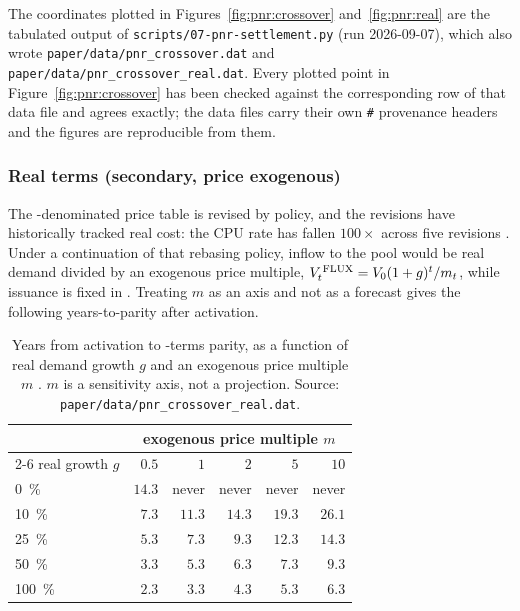 \begin{remark}
The coordinates plotted in Figures~\ref{fig:pnr:crossover} and~\ref{fig:pnr:real} are the tabulated
output of \texttt{scripts/\allowbreak{}07-pnr-settlement.\allowbreak{}py} (run 2026-09-07), which also wrote
\texttt{paper/\allowbreak{}data/\allowbreak{}pnr\_crossover.\allowbreak{}dat} and \texttt{paper/\allowbreak{}data/\allowbreak{}pnr\_crossover\_real.\allowbreak{}dat}. Every
plotted point in Figure~\ref{fig:pnr:crossover} has been checked against the corresponding row of
that data file and agrees exactly; the data files carry their own \texttt{\#} provenance headers and
the figures are reproducible from them.
\end{remark}

\subsubsection{Real terms (secondary, price exogenous)}
\label{sec:pnr:real}

The \flux-denominated price table is revised by policy, and the revisions have historically tracked
real cost: the CPU rate has fallen $100\times$ across five revisions \shipped
{}. Under a continuation of that
rebasing policy, \flux inflow to the pool would be real demand divided by an exogenous price multiple,
$V^{\,\mathrm{FLUX}}_t = V_0(1+g)^{t}/m_t$, while issuance is fixed in \flux. Treating $m$ as an axis and not
as a forecast gives the following years-to-parity after activation.

\begin{table}[H]
\centering
\small
\begin{tabular}{lrrrrr}
\toprule
 & \multicolumn{5}{c}{exogenous price multiple $m$}\\
\cmidrule(l){2-6}
real growth $g$ & $0.5$ & $1$ & $2$ & $5$ & $10$\\
\midrule
\SI{0}{\percent}   & $14.3$ & never & never & never & never\\
\SI{10}{\percent}  & $7.3$  & $11.3$ & $14.3$ & $19.3$ & $26.1$\\
\SI{25}{\percent}  & $5.3$  & $7.3$  & $9.3$  & $12.3$ & $14.3$\\
\SI{50}{\percent}  & $3.3$  & $5.3$  & $6.3$  & $7.3$  & $9.3$\\
\SI{100}{\percent} & $2.3$  & $3.3$  & $4.3$  & $5.3$  & $6.3$\\
\bottomrule
\end{tabular}
\caption{Years from activation to \flux-terms parity, as a function of real demand growth $g$ and an
exogenous price multiple $m$ \planned. $m$ is a sensitivity axis, not a projection.
Source: \texttt{paper/\allowbreak{}data/\allowbreak{}pnr\_crossover\_real.\allowbreak{}dat}.}
\label{tab:pnr:real}
\end{table}

